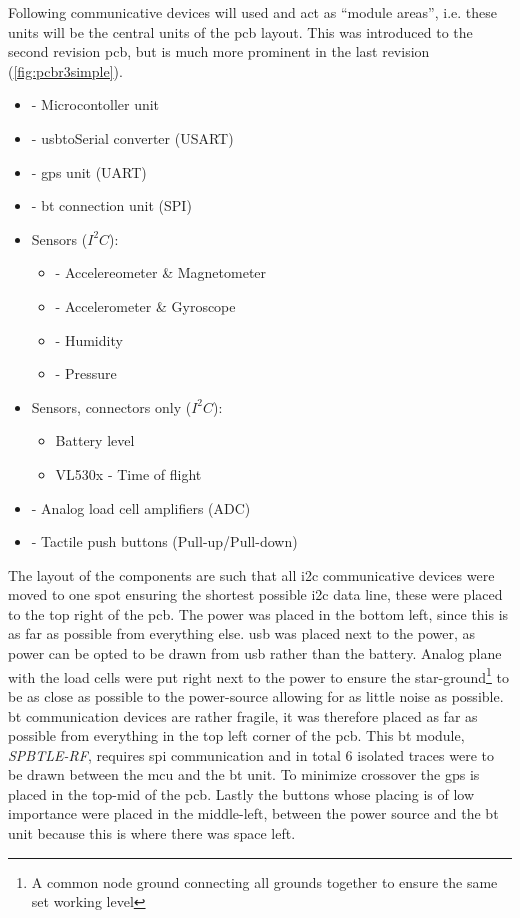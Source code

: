 Following communicative devices will used and act as ``module areas'', i.e. these units will be the central units of the \gls{pcb} layout. This was introduced to the second revision \gls{pcb}, but is much more prominent in the last revision (\autoref{fig:pcbr3simple}).
\begin{itemize}[noitemsep]
\item{ - Microcontoller unit}
\item{ - \gls{usb}toSerial converter (USART)}
\item{ - \gls{gps} unit (UART)}
\item{ - \gls{bt} connection unit (SPI)}
\item Sensors ($I^2C$):
	\begin{itemize}[noitemsep]
	\item{ - Accelereometer \& Magnetometer}
	\item{ - Accelerometer \& Gyroscope}
	\item{ - Humidity}
	\item{ - Pressure}
	\end{itemize}
\item Sensors, connectors only ($I^2C$):
	\begin{itemize}[noitemsep]
	\item Battery level
	\item VL530x \qquad- Time of flight
	\end{itemize}
\item{ - Analog load cell amplifiers (ADC)}
\item{ - Tactile push buttons (Pull-up/Pull-down)}
\end{itemize}
The layout of the components are such that all \gls{i2c} communicative devices were moved to one spot ensuring the shortest possible \gls{i2c} data line, these were placed to the top right of the \gls{pcb}. The power was placed in the bottom left, since this is as far as possible from everything else. \gls{usb} was placed next to the power, as power can be opted to be drawn from \gls{usb} rather than the battery. Analog plane with the load cells were put right next to the power to ensure the star-ground\footnote{A common node ground connecting all grounds together to ensure the same set working level} to be as close as possible to the power-source allowing for as little noise as possible. \gls{bt} communication devices are rather fragile, it was therefore placed as far as possible from everything in the top left corner of the \gls{pcb}. This \gls{bt} module, \emph{SPBTLE-RF}, requires \gls{spi} communication and in total $6$ isolated traces were to be drawn between the \gls{mcu} and the \gls{bt} unit. To minimize crossover the \gls{gps} is placed in the top-mid of the \gls{pcb}. Lastly the buttons whose placing is of low importance were placed in the middle-left, between the power source and the \gls{bt} unit because this is where there was space left. 
